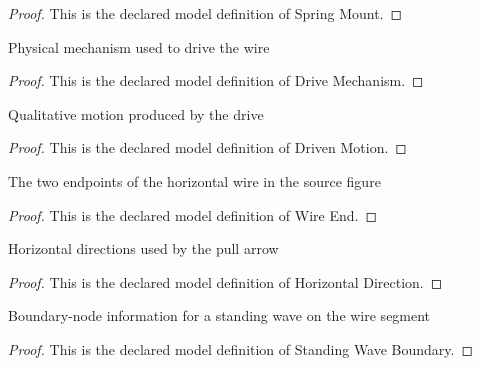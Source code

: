 \begin{proof}
  This is the declared model definition of Spring Mount.
\end{proof}
\begin{definition}
  \label{def:physics:phyx-mini-0180:phyxminiproblems-problemphyxmini0180-drivemechanism}
  Physical mechanism used to drive the wire
\end{definition}
\begin{proof}
  This is the declared model definition of Drive Mechanism.
\end{proof}
\begin{definition}
  \label{def:physics:phyx-mini-0180:phyxminiproblems-problemphyxmini0180-drivenmotion}
  Qualitative motion produced by the drive
\end{definition}
\begin{proof}
  This is the declared model definition of Driven Motion.
\end{proof}
\begin{definition}
  \label{def:physics:phyx-mini-0180:phyxminiproblems-problemphyxmini0180-wireend}
  The two endpoints of the horizontal wire in the source figure
\end{definition}
\begin{proof}
  This is the declared model definition of Wire End.
\end{proof}
\begin{definition}
  \label{def:physics:phyx-mini-0180:phyxminiproblems-problemphyxmini0180-horizontaldirection}
  Horizontal directions used by the pull arrow
\end{definition}
\begin{proof}
  This is the declared model definition of Horizontal Direction.
\end{proof}
\begin{definition}
  \label{def:physics:phyx-mini-0180:phyxminiproblems-problemphyxmini0180-standingwaveboundary}
  Boundary-node information for a standing wave on the wire segment
\end{definition}
\begin{proof}
  This is the declared model definition of Standing Wave Boundary.
\end{proof}
